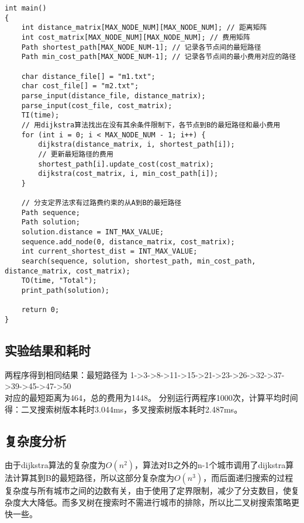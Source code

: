 \documentclass{article}
\begin{document}
\begin{lstlisting}
int main()
{
    int distance_matrix[MAX_NODE_NUM][MAX_NODE_NUM]; // 距离矩阵
    int cost_matrix[MAX_NODE_NUM][MAX_NODE_NUM]; // 费用矩阵
    Path shortest_path[MAX_NODE_NUM-1]; // 记录各节点间的最短路径
    Path min_cost_path[MAX_NODE_NUM-1]; // 记录各节点间的最小费用对应的路径

    char distance_file[] = "m1.txt";
    char cost_file[] = "m2.txt";
    parse_input(distance_file, distance_matrix);
    parse_input(cost_file, cost_matrix);
    TI(time);
    // 用dijkstra算法找出在没有其余条件限制下，各节点到B的最短路径和最小费用
    for (int i = 0; i < MAX_NODE_NUM - 1; i++) {
        dijkstra(distance_matrix, i, shortest_path[i]);
        // 更新最短路径的费用
        shortest_path[i].update_cost(cost_matrix);
        dijkstra(cost_matrix, i, min_cost_path[i]);
    }

    // 分支定界法求有过路费约束的从A到B的最短路径
    Path sequence;
    Path solution;
    solution.distance = INT_MAX_VALUE;
    sequence.add_node(0, distance_matrix, cost_matrix);
    int current_shortest_dist = INT_MAX_VALUE;
    search(sequence, solution, shortest_path, min_cost_path, distance_matrix, cost_matrix);
    TO(time, "Total");
    print_path(solution);

    return 0;
}
\end{lstlisting}
	\subsection{实验结果和耗时}
	两程序得到相同结果：最短路径为 1->3->8->11->15->21->23->26->32->37->39->45->47->50 \\
    对应的最短距离为464，总的费用为1448。	
    分别运行两程序1000次，计算平均时间得：二叉搜索树版本耗时3.044ms，多叉搜索树版本耗时2.487ms。
    \subsection{复杂度分析}
    由于dijkstra算法的复杂度为$O(n^2)$，算法对B之外的n-1个城市调用了dijkstra算法计算其到B的最短路径，所以这部分复杂度为$O(n^3)$，而后面递归搜索的过程复杂度与所有城市之间的边数有关，由于使用了定界限制，减少了分支数目，使复杂度大大降低。而多叉树在搜索时不需进行城市的排除，所以比二叉树搜索策略更快一些。
\end{document}
